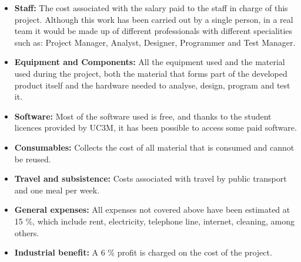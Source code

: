 \begin{itemize}
	\item \textbf{Staff:} The cost associated with the salary paid to the staff in charge of this project. Although this work has been carried out by a single person, in a real team it would be made up of different professionals with different specialities such as: Project Manager, Analyst, Designer, Programmer and Test Manager.
	\item \textbf{Equipment and Components:} All the equipment used and the material used during the project, both the material that forms part of the developed product itself and the hardware needed to analyse, design, program and test it.
	\item \textbf{Software:} Most of the software used is free, and thanks to the student licences provided by UC3M, it has been possible to access some paid software.
	\item \textbf{Consumables:} Collects the cost of all material that is consumed and cannot be reused.
	\item \textbf{Travel and subsistence:} Costs associated with travel by public transport and one meal per week.
	\item \textbf{General expenses:} All expenses not covered above have been estimated at 15 \%, which include rent, electricity, telephone line, internet, cleaning, among others.
	\item \textbf{Industrial benefit:} A 6 \% profit is charged on the cost of the project.
\end{itemize}

